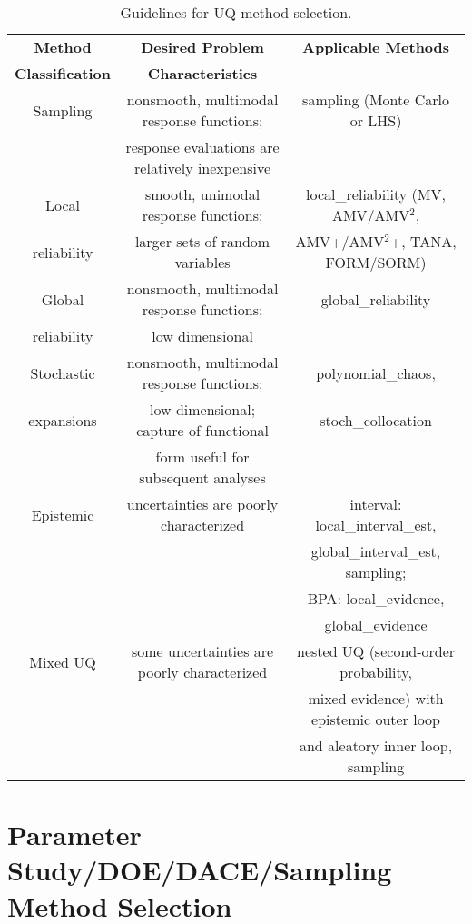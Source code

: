\begin{table}
\centering
\caption{Guidelines for UQ method selection.} \label{usage:guideuq}\vspace{2mm}
\begin{tabular}{|c|c|c|}
\hline
\textbf{Method} & \textbf{Desired Problem} & \textbf{Applicable Methods} \\
\textbf{Classification} & \textbf{Characteristics} & \\
\hline
Sampling & nonsmooth, multimodal response functions;       & sampling 
(Monte Carlo or LHS) \\
         & response evaluations are relatively inexpensive & \\
\hline
Local       & smooth, unimodal response functions; & local\_reliability
(MV, AMV/AMV$^2$,\\
reliability & larger sets of random variables & AMV+/AMV$^2$+, TANA, 
FORM/SORM) \\
\hline
Global      & nonsmooth, multimodal response functions; & 
global\_reliability \\
reliability & low dimensional     & \\
\hline
Stochastic & nonsmooth, multimodal response functions; & 
polynomial\_chaos, \\
expansions & low dimensional; capture of functional    & 
stoch\_collocation\\
           & form useful for subsequent analyses       & \\
\hline
Epistemic & uncertainties are poorly characterized &
interval: local\_interval\_est, \\
 & & global\_interval\_est, sampling; \\
 & & BPA: local\_evidence, \\
 & & global\_evidence \\
\hline
Mixed UQ  & some uncertainties are poorly characterized &
nested UQ (second-order probability, \\
 & & mixed evidence) with epistemic outer loop \\
 & & and aleatory inner loop, sampling \\
\hline
\end{tabular}
\end{table}

\section{Parameter Study/DOE/DACE/Sampling Method Selection}\label{usage:ps}

